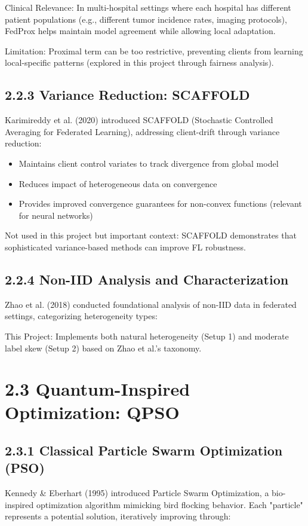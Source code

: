 Clinical Relevance: In multi-hospital settings where each hospital has different patient populations (e.g., different tumor incidence rates, imaging protocols), FedProx helps maintain model agreement while allowing local adaptation.

Limitation: Proximal term can be too restrictive, preventing clients from learning local-specific patterns (explored in this project through fairness analysis).


\subsection{2.2.3 Variance Reduction: SCAFFOLD}
Karimireddy et al. (2020) introduced SCAFFOLD (Stochastic Controlled Averaging for Federated Learning), addressing client-drift through variance reduction:

\begin{itemize}
  \item Maintains client control variates to track divergence from global model
  \item Reduces impact of heterogeneous data on convergence
  \item Provides improved convergence guarantees for non-convex functions (relevant for neural networks)
\end{itemize}

Not used in this project but important context: SCAFFOLD demonstrates that sophisticated variance-based methods can improve FL robustness.


\subsection{2.2.4 Non-IID Analysis and Characterization}
Zhao et al. (2018) conducted foundational analysis of non-IID data in federated settings, categorizing heterogeneity types:

This Project: Implements both natural heterogeneity (Setup 1) and moderate label skew (Setup 2) based on Zhao et al.'s taxonomy.


\section{2.3 Quantum-Inspired Optimization: QPSO}

\subsection{2.3.1 Classical Particle Swarm Optimization (PSO)}
Kennedy \& Eberhart (1995) introduced Particle Swarm Optimization, a bio-inspired optimization algorithm mimicking bird flocking behavior. Each "particle" represents a potential solution, iteratively improving through:

